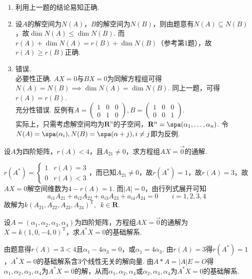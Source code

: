 \begin{exercise}
\begin{exgroup}
\begin{answer}
\begin{enumerate}
                \item 利用上一题的结论易知正确.

                \item 设$A$的解空间为$N(A)$，$B$的解空间为$N(B)$，则由题意有$N(A)\subseteq N(B)$，故$\dim{N(A)}\leqslant \dim{N(B)}$. 而$r(A)+\dim{N(A)}=r(B)+\dim{N(B)}$（参考第1题），故$r(A)\geqslant r(B)$正确.

                \item 错误.\\
                      必要性正确. $AX=0$与$BX=0$为同解方程组可得$N(A)=N(B)\implies\dim{N(A)}=\dim{N(B)}$. 同上一题，可得$r(A)=r(B)$.\\
                      充分性错误. 反例有$A=\begin{pmatrix}
                              1 & 0 & 0 \\
                              0 & 1 & 0
                          \end{pmatrix}, B=\begin{pmatrix}
                              1 & 0 & 0 \\
                              0 & 0 & 1
                          \end{pmatrix}$.\\
                      实际上，只需考虑解空间均为$\mathbf{R}^n$的子空间，$\mathbf{R}^n=\spa(\alpha_1,\ldots,\alpha_n)$. 令$N(A)=\spa(\alpha_i), N(B)=\spa(\alpha+j),i\neq j$即为反例.
            \end{enumerate}
        \end{answer}

        \item 设$A$为四阶矩阵，$r(A)<4$，且$A_{21}\neq 0$，求方程组$AX=\vec{0}$的通解.
        \begin{answer}
            $r(A^*)=
              \begin{cases}
                  1 & r(A)=3 \\
                  0 & r(A)<3
              \end{cases}$，而已知$A_{21}\neq 0$，故$r(A^*)=1$，故$r(A)=3$，故$AX = 0$解空间维数为$4-r(A)=1$. 而$|A|=0$，由行列式展开可知
          \[ a_{i1}A_{21}+a_{i2}A_{22}+a_{i3}A_{23}+a_{i4}A_{24}=0 \qquad i=1,2,3,4 \]
          故解为$k(A_{21},A_{22},A_{23},A_{24})^\mathrm{T},\enspace k\in \mathbf{R}$.
        \end{answer}

        \item 设$A=(\alpha_1,\alpha_2,\alpha_3,\alpha_4)$为四阶矩阵，方程组$AX=\vec{0}$的通解为$X=k(1,0,-4,0)^\mathrm{T}$，求$A^*X=0$的基础解系.
        \begin{answer}
            由题意得$r(A)=3<4$且$\alpha_1-4\alpha_3=0$，或$\alpha_1=4\alpha_3$. 由$r(A)=3$得$r(A^*)=1$，$A^*X=0$的基础解系含3个线性无关的解向量. 由$A*A=|A|E=O$得$\alpha_1,\alpha_2,\alpha_3,\alpha_4$为$A^*X=0$的解，从而$\alpha_1,\alpha_2,\alpha_4$或$\alpha_2,\alpha_3,\alpha_4$为$A^*X=0$的基础解系.
        \end{answer}


\end{exgroup}
\end{exercise}
